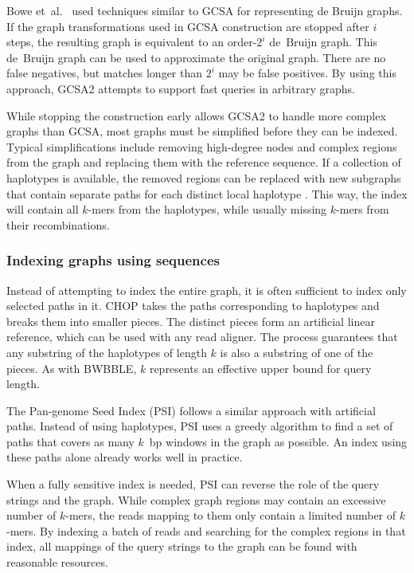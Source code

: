 Bowe et~al.\ \cite{Bowe_2012} used techniques similar to GCSA for representing de Bruijn graphs. If the graph transformations used in GCSA construction are stopped after $i$ steps, the resulting graph is equivalent to an order-$2^{i}$ de~Bruijn graph. This de~Bruijn graph can be used to approximate the original graph. There are no false negatives, but matches longer than $2^{i}$ may be false positives. By using this approach, GCSA2 \cite{Siren_2017} attempts to support fast queries in arbitrary graphs.

While stopping the construction early allows GCSA2 to handle more complex graphs than GCSA, most graphs must be simplified before they can be indexed. Typical simplifications include removing high-degree nodes and complex regions from the graph and replacing them with the reference sequence. If a collection of haplotypes is available, the removed regions can be replaced with new subgraphs that contain separate paths for each distinct local haplotype \cite{Siren_2019}. This way, the index will contain all $k$-mers from the haplotypes, while usually missing $k$-mers from their recombinations.

\subsubsection{Indexing graphs using sequences}

Instead of attempting to index the entire graph, it is often sufficient to index only selected paths in it. CHOP \cite{Mokveld_2018} takes the paths corresponding to haplotypes and breaks them into smaller pieces. The distinct pieces form an artificial linear reference, which can be used with any read aligner. The process guarantees that any substring of the haplotypes of length $k$ is also a substring of one of the pieces. As with BWBBLE, $k$ represents an effective upper bound for query length.

The Pan-genome Seed Index (PSI) \cite{Ghaffaari_2019} follows a similar approach with artificial paths. Instead of using haplotypes, PSI uses a greedy algorithm to find a set of paths that covers as many $k$~bp windows in the graph as possible. An index using these paths alone already works well in practice.

When a fully sensitive index is needed, PSI can reverse the role of the query strings and the graph. While complex graph regions may contain an excessive number of $k$-mers, the reads mapping to them only contain a limited number of $k$-mers. By indexing a batch of reads and searching for the complex regions in that index, all mappings of the query strings to the graph can be found with reasonable resources.


